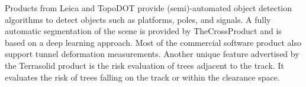 Products from Leica and TopoDOT provide (semi)-automated object detection algorithms to detect objects such as platforms, poles, and signals. A fully automatic segmentation of the scene is provided by TheCrossProduct and is based on a deep learning approach.
Most of the commercial software product also support tunnel deformation measurements. 
Another unique feature advertised by the Terrasolid product is the risk evaluation of trees adjacent to the track. It evaluates the risk of trees falling on the track or within the clearance space.